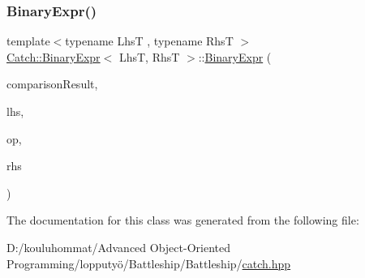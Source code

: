 \subsubsection{\texorpdfstring{Binary\+Expr()}{BinaryExpr()}}
{\footnotesize\ttfamily template$<$typename LhsT , typename RhsT $>$ \\
\mbox{\hyperlink{class_catch_1_1_binary_expr}{Catch\+::\+Binary\+Expr}}$<$ LhsT, RhsT $>$\+::\mbox{\hyperlink{class_catch_1_1_binary_expr}{Binary\+Expr}} (\begin{DoxyParamCaption}\item[{bool}]{comparison\+Result,  }\item[{LhsT}]{lhs,  }\item[{\mbox{\hyperlink{class_catch_1_1_string_ref}{String\+Ref}}}]{op,  }\item[{RhsT}]{rhs }\end{DoxyParamCaption})\hspace{0.3cm}{\ttfamily [inline]}}



The documentation for this class was generated from the following file\+:\begin{DoxyCompactItemize}
\item 
D\+:/kouluhommat/\+Advanced Object-\/\+Oriented Programming/lopputyö/\+Battleship/\+Battleship/\mbox{\hyperlink{catch_8hpp}{catch.\+hpp}}\end{DoxyCompactItemize}
